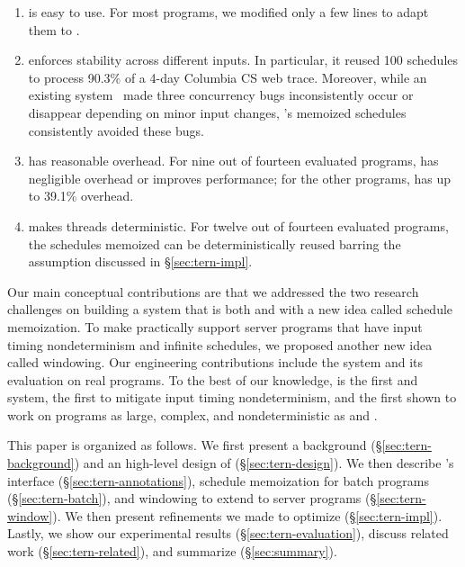 \begin{enumerate}

\item \tern is easy to use.  For most programs, we modified only a few
  lines to adapt them to \tern.

\item \tern enforces stability across different inputs.  In particular, it
  reused 100 schedules to process 90.3\% of a 4-day Columbia CS web trace.
  Moreover, while an existing \dmt system~\cite{coredet:asplos10} made
  three concurrency bugs inconsistently occur or disappear depending on minor
  input changes, \tern's memoized schedules consistently avoided these bugs.

\item \tern has reasonable overhead.  For nine out of fourteen
  evaluated programs, \tern has negligible overhead or improves
  performance; for the other programs, \tern has up to 39.1\%
  overhead.

\item \tern makes threads deterministic.  For twelve out of fourteen
  evaluated programs, the schedules \tern memoized can be deterministically
  reused barring the assumption discussed in \S\ref{sec:tern-impl}.

\end{enumerate}

Our main conceptual contributions are that we addressed the two research
challenges on building a system that is both \smt and \dmt with a new idea
called schedule memoization. To make \tern practically support server programs
that have input timing nondeterminism and infinite schedules, we proposed
another new idea called windowing. Our engineering contributions include the
\tern system and its evaluation on real programs.  To the best of our knowledge,
\tern is the first \smt and \dmt system, the first to mitigate input timing
nondeterminism, and the first shown to work on programs as large, complex, and
nondeterministic as \apache and \mysql.

This paper is organized as follows.  We first present a background
(\S\ref{sec:tern-background}) and an high-level design of \tern
(\S\ref{sec:tern-design}). We then describe \tern's interface
(\S\ref{sec:tern-annotations}), schedule memoization for batch programs
(\S\ref{sec:tern-batch}), and windowing to extend \tern to server programs
(\S\ref{sec:tern-window}).  We then present refinements we made to optimize
\tern (\S\ref{sec:tern-impl}).  Lastly, we show our experimental results
(\S\ref{sec:tern-evaluation}), discuss related work (\S\ref{sec:tern-related}),
and summarize (\S\ref{sec:summary}).
